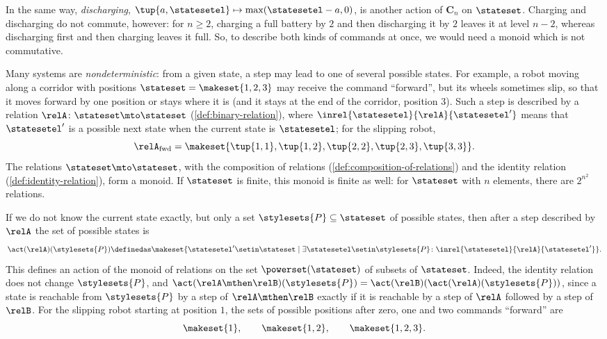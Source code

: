 \begin{example}
    In the same way, \emph{discharging}, $\tup{a, \statesetel} \mapsto \max(\statesetel - a, 0)$, is another action of $\mathbf{C}_n$ on $\stateset$.
    Charging and discharging do not commute, however: for $n \geq 2$, charging a full battery by $2$ and then discharging it by $2$ leaves it at level $n - 2$, whereas discharging first and then charging leaves it full.
    So, to describe both kinds of commands at once, we would need a monoid which is not commutative.
\end{example}

\begin{example}
    \label{exa:relations-acting-on-subsets}
    Many systems are \emph{nondeterministic}: from a given state, a step may lead to one of several possible states.
    For example, a robot moving along a corridor with positions $\stateset = \makeset{1, 2, 3}$ may receive the command ``forward'', but its wheels sometimes slip, so that it moves forward by one position or stays where it is (and it stays at the end of the corridor, position $3$).
    Such a step is described by a relation $\relA \colon \stateset \mto \stateset$ (\cref{def:binary-relation}), where $\inrel{\statesetel}{\relA}{\statesetel'}$ means that $\statesetel'$ is a possible next state when the current state is $\statesetel$; for the slipping robot,
    \begin{equation}
        \relA_{\text{fwd}} = \makeset{\tup{1, 1}, \tup{1, 2}, \tup{2, 2}, \tup{2, 3}, \tup{3, 3}}.
    \end{equation}
    The relations $\stateset \mto \stateset$, with the composition of relations (\cref{def:composition-of-relations}) and the identity relation (\cref{def:identity-relation}), form a monoid.
    If $\stateset$ is finite, this monoid is finite as well: for $\stateset$ with $n$ elements, there are $2^{n^2}$ relations.

    If we do not know the current state exactly, but only a set $\stylesets{P} \subseteq \stateset$ of possible states, then after a step described by $\relA$ the set of possible states is
    \begin{equation}
        \act(\relA)(\stylesets{P}) \definedas \makeset{\statesetel' \setin \stateset \mid \exists \statesetel \setin \stylesets{P} \colon \inrel{\statesetel}{\relA}{\statesetel'}}.
    \end{equation}
    This defines an action of the monoid of relations on the set $\powerset(\stateset)$ of subsets of $\stateset$.
    Indeed, the identity relation does not change $\stylesets{P}$, and $\act(\relA \mthen \relB)(\stylesets{P}) = \act(\relB)(\act(\relA)(\stylesets{P}))$, since a state is reachable from $\stylesets{P}$ by a step of $\relA \mthen \relB$ exactly if it is reachable by a step of $\relA$ followed by a step of $\relB$.
    For the slipping robot starting at position $1$, the sets of possible positions after zero, one and two commands ``forward'' are
    \begin{equation}
        \makeset{1}, \qquad \makeset{1, 2}, \qquad \makeset{1, 2, 3}.
    \end{equation}


\end{example}

